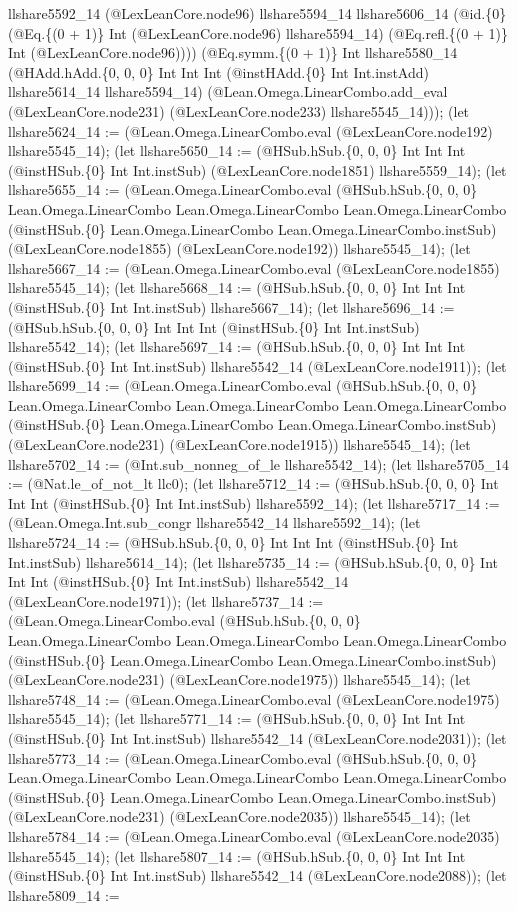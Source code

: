 \documentclass[11pt]{article}
\begin{document}
llshare5592\_14 (@LexLeanCore.node96) llshare5594\_14 llshare5606\_14 (@id.\{0\} (@Eq.\{(0 + 1)\} Int (@LexLeanCore.node96) llshare5594\_14) (@Eq.refl.\{(0 + 1)\} Int (@LexLeanCore.node96)))) (@Eq.symm.\{(0 + 1)\} Int llshare5580\_14 (@HAdd.hAdd.\{0, 0, 0\} Int Int Int (@instHAdd.\{0\} Int Int.instAdd) llshare5614\_14 llshare5594\_14) (@Lean.Omega.LinearCombo.add\_eval (@LexLeanCore.node231) (@LexLeanCore.node233) llshare5545\_14))); (let llshare5624\_14 := (@Lean.Omega.LinearCombo.eval (@LexLeanCore.node192) llshare5545\_14); (let llshare5650\_14 := (@HSub.hSub.\{0, 0, 0\} Int Int Int (@instHSub.\{0\} Int Int.instSub) (@LexLeanCore.node1851) llshare5559\_14); (let llshare5655\_14 := (@Lean.Omega.LinearCombo.eval (@HSub.hSub.\{0, 0, 0\} Lean.Omega.LinearCombo Lean.Omega.LinearCombo Lean.Omega.LinearCombo (@instHSub.\{0\} Lean.Omega.LinearCombo Lean.Omega.LinearCombo.instSub) (@LexLeanCore.node1855) (@LexLeanCore.node192)) llshare5545\_14); (let llshare5667\_14 := (@Lean.Omega.LinearCombo.eval (@LexLeanCore.node1855) llshare5545\_14); (let llshare5668\_14 := (@HSub.hSub.\{0, 0, 0\} Int Int Int (@instHSub.\{0\} Int Int.instSub) llshare5667\_14); (let llshare5696\_14 := (@HSub.hSub.\{0, 0, 0\} Int Int Int (@instHSub.\{0\} Int Int.instSub) llshare5542\_14); (let llshare5697\_14 := (@HSub.hSub.\{0, 0, 0\} Int Int Int (@instHSub.\{0\} Int Int.instSub) llshare5542\_14 (@LexLeanCore.node1911)); (let llshare5699\_14 := (@Lean.Omega.LinearCombo.eval (@HSub.hSub.\{0, 0, 0\} Lean.Omega.LinearCombo Lean.Omega.LinearCombo Lean.Omega.LinearCombo (@instHSub.\{0\} Lean.Omega.LinearCombo Lean.Omega.LinearCombo.instSub) (@LexLeanCore.node231) (@LexLeanCore.node1915)) llshare5545\_14); (let llshare5702\_14 := (@Int.sub\_nonneg\_of\_le llshare5542\_14); (let llshare5705\_14 := (@Nat.le\_of\_not\_lt llc0); (let llshare5712\_14 := (@HSub.hSub.\{0, 0, 0\} Int Int Int (@instHSub.\{0\} Int Int.instSub) llshare5592\_14); (let llshare5717\_14 := (@Lean.Omega.Int.sub\_congr llshare5542\_14 llshare5592\_14); (let llshare5724\_14 := (@HSub.hSub.\{0, 0, 0\} Int Int Int (@instHSub.\{0\} Int Int.instSub) llshare5614\_14); (let llshare5735\_14 := (@HSub.hSub.\{0, 0, 0\} Int Int Int (@instHSub.\{0\} Int Int.instSub) llshare5542\_14 (@LexLeanCore.node1971)); (let llshare5737\_14 := (@Lean.Omega.LinearCombo.eval (@HSub.hSub.\{0, 0, 0\} Lean.Omega.LinearCombo Lean.Omega.LinearCombo Lean.Omega.LinearCombo (@instHSub.\{0\} Lean.Omega.LinearCombo Lean.Omega.LinearCombo.instSub) (@LexLeanCore.node231) (@LexLeanCore.node1975)) llshare5545\_14); (let llshare5748\_14 := (@Lean.Omega.LinearCombo.eval (@LexLeanCore.node1975) llshare5545\_14); (let llshare5771\_14 := (@HSub.hSub.\{0, 0, 0\} Int Int Int (@instHSub.\{0\} Int Int.instSub) llshare5542\_14 (@LexLeanCore.node2031)); (let llshare5773\_14 := (@Lean.Omega.LinearCombo.eval (@HSub.hSub.\{0, 0, 0\} Lean.Omega.LinearCombo Lean.Omega.LinearCombo Lean.Omega.LinearCombo (@instHSub.\{0\} Lean.Omega.LinearCombo Lean.Omega.LinearCombo.instSub) (@LexLeanCore.node231) (@LexLeanCore.node2035)) llshare5545\_14); (let llshare5784\_14 := (@Lean.Omega.LinearCombo.eval (@LexLeanCore.node2035) llshare5545\_14); (let llshare5807\_14 := (@HSub.hSub.\{0, 0, 0\} Int Int Int (@instHSub.\{0\} Int Int.instSub) llshare5542\_14 (@LexLeanCore.node2088)); (let llshare5809\_14 := 
\end{document}
